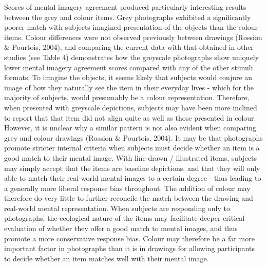 \documentclass[
  11pt,
]{article}
\begin{document}
Scores of mental imagery agreement produced particularly interesting
results between the grey and colour items. Grey photographs exhibited a
significantly poorer match with subjects imagined presentation of the
objects than the colour items. Colour differences were not observed
previously between drawings (Rossion \& Pourtois, 2004), and comparing
the current data with that obtained in other studies (see Table 4)
demonstrates how the greyscale photographs show uniquely lower mental
imagery agreement scores compared with any of the other stimuli formats.
To imagine the objects, it seems likely that subjects would conjure an
image of how they naturally see the item in their everyday lives - which
for the majority of subjects, would presumably be a colour
representation. Therefore, when presented with greyscale depictions,
subjects may have been more inclined to report that that item did not
align quite as well as those presented in colour. However, it is unclear
why a similar pattern is not also evident when comparing grey and colour
drawings (Rossion \& Pourtois, 2004). It may be that photographs promote
stricter internal criteria when subjects must decide whether an item is
a good match to their mental image. With line-drawn / illustrated items,
subjects may simply accept that the items are baseline depictions, and
that they will only able to match their real-world mental images to a
certain degree - thus leading to a generally more liberal response bias
throughout. The addition of colour may therefore do very little to
further reconcile the match between the drawing and real-world mental
representation. When subjects are responding only to photographs, the
ecological nature of the items may facilitate deeper critical evaluation
of whether they offer a good match to mental images, and thus promote a
more conservative response bias. Colour may therefore be a far more
important factor in photographs than it is in drawings for allowing
participants to decide whether an item matches well with their mental
image.
\end{document}
